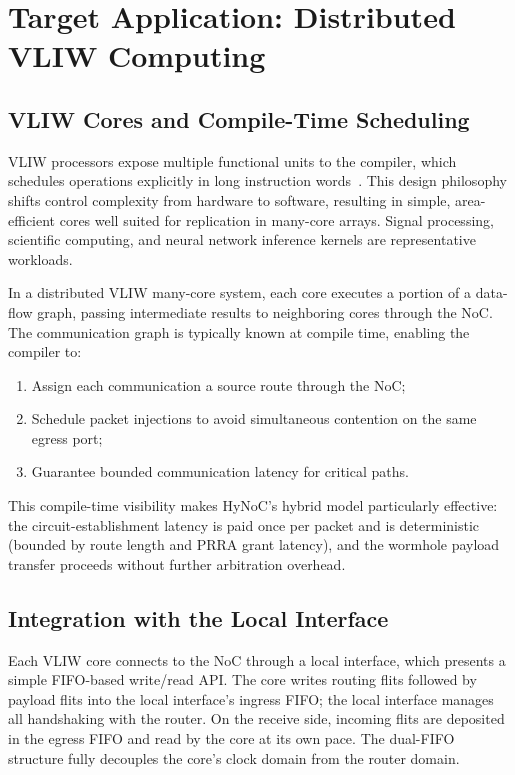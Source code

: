 \section{Target Application: Distributed VLIW Computing}
\label{sec:target}

\subsection{VLIW Cores and Compile-Time Scheduling}

VLIW processors expose multiple functional units to the compiler, which schedules
operations explicitly in long instruction words~\cite{ellis1986}. This design
philosophy shifts control complexity from hardware to software, resulting in
simple, area-efficient cores well suited for replication in many-core arrays.
Signal processing, scientific computing, and neural network inference kernels are
representative workloads.

In a distributed VLIW many-core system, each core executes a portion of a
data-flow graph, passing intermediate results to neighboring cores through the
NoC. The communication graph is typically known at compile time, enabling the
compiler to:
\begin{enumerate}
  \item Assign each communication a source route through the NoC;
  \item Schedule packet injections to avoid simultaneous contention on the same
        egress port;
  \item Guarantee bounded communication latency for critical paths.
\end{enumerate}

This compile-time visibility makes HyNoC's hybrid model particularly effective:
the circuit-establishment latency is paid once per packet and is deterministic
(bounded by route length and PRRA grant latency), and the wormhole payload
transfer proceeds without further arbitration overhead.

\subsection{Integration with the Local Interface}

Each VLIW core connects to the NoC through a local interface, which presents a
simple FIFO-based write/read API. The core writes routing flits followed by
payload flits into the local interface's ingress FIFO; the local interface manages
all handshaking with the router. On the receive side, incoming flits are deposited
in the egress FIFO and read by the core at its own pace. The dual-FIFO structure
fully decouples the core's clock domain from the router domain.


